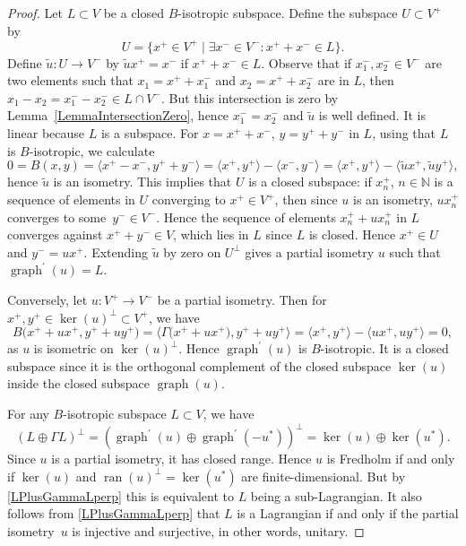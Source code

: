 \documentclass[10pt,a4paper]{amsart}
\numberwithin{equation}{section}
\DeclareMathOperator*{\ran}{ran}
\DeclareMathOperator{\graph}{\mathrm{graph}}
\newcommand{\N}{\mathbb{N}}
\begin{document}
\begin{proof}
Let $L \subset V$ be a closed $B$-isotropic subspace.
Define the subspace $U \subset V^+$ by
\begin{equation*}
U = \big\{x^+ \in V^+ \mid \exists x^- \in V^- \colon x^+ + x^- \in L\big\}.
\end{equation*}
Define $\tilde{u}\colon U \to V^-$ by $\tilde{u}x^+ = x^-$ if $x^+ + x^- \in L$.
Observe that if $x^-_1, x^-_2 \in V^-$ are two elements such that $x_1= x^+ + x^-_1$ and $x_2 = x^+ + x^-_2$ are in $L$, then $x_1 - x_2 = x^-_1 - x^-_2 \in L \cap V^-$.
But this intersection is zero by Lemma~\ref{LemmaIntersectionZero}, hence $x^-_1 = x^-_2$ and $\tilde{u}$ is well defined.
It is linear because $L$ is a subspace.
For $x = x^+ + x^-$, $y = y^+ + y^-$ in $L$, using that $L$ is $B$-isotropic, we calculate
\begin{equation*}
 0 = B(x, y) = \big\langle x^+ - x^-, y^+ + y^-\big\rangle = \big\langle x^+, y^+\big\rangle - \big\langle x^-, y^-\big\rangle = \big\langle x^+, y^+\big\rangle - \big\langle \tilde{u}x^+, \tilde{u}y^+\big\rangle,
\end{equation*}
hence $\tilde{u}$ is an isometry.
This implies that $U$ is a closed subspace: if $x_n^+$, $n \in \N$ is a sequence of elements in $U$ converging to $x^+ \in V^+$, then since $u$ is an isometry, $ux_n^+$ converges to some~${y^- \in V^-}$.
Hence the sequence of elements $x_n^+ + u x_n^+$ in $L$ converges against $x^+ + y^- \in V$, which lies in $L$ since $L$ is closed.
Hence $x^+ \in U$ and $y^- = u x^+$.
Extending $\tilde{u}$ by zero on $U^\perp$ gives a partial isometry $u$ such that $\graph^\prime(u) = L$.

Conversely, let $u \colon V^+ \to V^-$ be a partial isometry.
Then for $x^+, y^+ \in \ker(u)^\perp \subset V^+$, we have
\begin{equation*}
 B\big(x^+ + u x^+, y^+ + u y^+\big) = \big\langle \Gamma\big(x^+ + u x^+\big), y^+ + u y^+ \big\rangle = \big\langle x^+, y^+\big\rangle - \big\langle ux^+, uy^+\big\rangle = 0,
\end{equation*}
as $u$ is isometric on $\ker(u)^\perp$.
Hence $\graph^\prime(u)$ is $B$-isotropic.
It is a closed subspace since it is the orthogonal complement of the closed subspace $\ker(u)$ inside the closed subspace $\graph(u)$.

For any $B$-isotropic subspace $L \subset V$, we have
\begin{equation} \label{LPlusGammaLperp}
(L \oplus \Gamma L)^\perp = (\graph^\prime(u) \oplus \graph^\prime(-u^*))^\perp = \ker(u) \oplus \ker(u^*).
\end{equation}
Since $u$ is a partial isometry, it has closed range.
Hence $u$ is Fredholm if and only if $\ker(u)$ and $\ran(u)^\perp = \ker(u^*)$ are finite-dimensional.
But by \eqref{LPlusGammaLperp} this is equivalent to $L$ being a sub-Lagrangian.
It also follows from \eqref{LPlusGammaLperp} that $L$ is a Lagrangian if and only if the partial isometry~$u$ is injective and surjective, in other words, unitary.
\end{proof}
\end{document}
